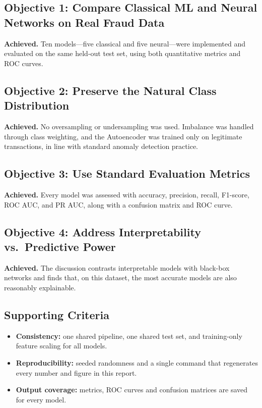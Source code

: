 \documentclass[journal]{IEEEtran}
\begin{document}
\subsection{Objective 1: Compare Classical ML and Neural Networks on Real Fraud Data}
\textbf{Achieved.} Ten models---five classical and five neural---were implemented and evaluated on the same held-out test set, using both quantitative metrics and ROC curves.

\subsection{Objective 2: Preserve the Natural Class Distribution}
\textbf{Achieved.} No oversampling or undersampling was used. Imbalance was handled through class weighting, and the Autoencoder was trained only on legitimate transactions, in line with standard anomaly detection practice.

\subsection{Objective 3: Use Standard Evaluation Metrics}
\textbf{Achieved.} Every model was assessed with accuracy, precision, recall, F1-score, ROC AUC, and PR AUC, along with a confusion matrix and ROC curve.

\subsection{Objective 4: Address Interpretability vs.\ Predictive Power}
\textbf{Achieved.} The discussion contrasts interpretable models with black-box networks and finds that, on this dataset, the most accurate models are also reasonably explainable.

\subsection{Supporting Criteria}
\begin{itemize}
  \item \textbf{Consistency:} one shared pipeline, one shared test set, and training-only feature scaling for all models.
  \item \textbf{Reproducibility:} seeded randomness and a single command that regenerates every number and figure in this report.
  \item \textbf{Output coverage:} metrics, ROC curves and confusion matrices are saved for every model.
\end{itemize}
\end{document}
